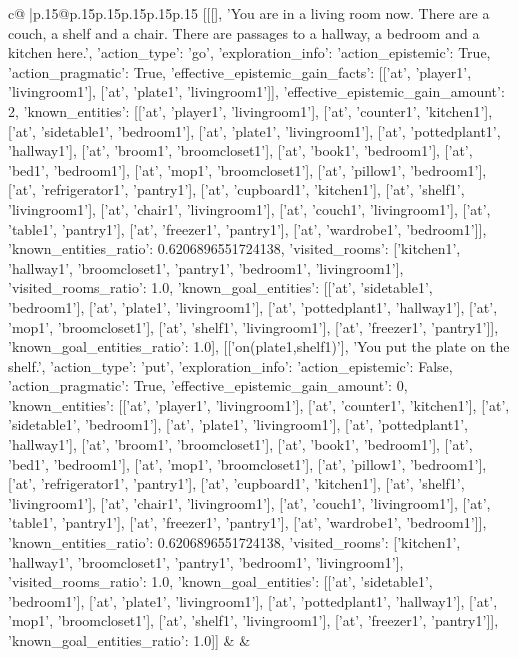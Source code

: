 \documentclass{article}
\begin{document}
{\begin{supertabular}{c@{$\;$}|p{.15\linewidth}@{}p{.15\linewidth}p{.15\linewidth}p{.15\linewidth}p{.15\linewidth}p{.15\linewidth}}
{{{	 [[[], 'You are in a living room now. There are a couch, a shelf and a chair. There are passages to a hallway, a bedroom and a kitchen here.', {'action_type': 'go', 'exploration_info': {'action_epistemic': True, 'action_pragmatic': True, 'effective_epistemic_gain_facts': [['at', 'player1', 'livingroom1'], ['at', 'plate1', 'livingroom1']], 'effective_epistemic_gain_amount': 2, 'known_entities': [['at', 'player1', 'livingroom1'], ['at', 'counter1', 'kitchen1'], ['at', 'sidetable1', 'bedroom1'], ['at', 'plate1', 'livingroom1'], ['at', 'pottedplant1', 'hallway1'], ['at', 'broom1', 'broomcloset1'], ['at', 'book1', 'bedroom1'], ['at', 'bed1', 'bedroom1'], ['at', 'mop1', 'broomcloset1'], ['at', 'pillow1', 'bedroom1'], ['at', 'refrigerator1', 'pantry1'], ['at', 'cupboard1', 'kitchen1'], ['at', 'shelf1', 'livingroom1'], ['at', 'chair1', 'livingroom1'], ['at', 'couch1', 'livingroom1'], ['at', 'table1', 'pantry1'], ['at', 'freezer1', 'pantry1'], ['at', 'wardrobe1', 'bedroom1']], 'known_entities_ratio': 0.6206896551724138, 'visited_rooms': ['kitchen1', 'hallway1', 'broomcloset1', 'pantry1', 'bedroom1', 'livingroom1'], 'visited_rooms_ratio': 1.0, 'known_goal_entities': [['at', 'sidetable1', 'bedroom1'], ['at', 'plate1', 'livingroom1'], ['at', 'pottedplant1', 'hallway1'], ['at', 'mop1', 'broomcloset1'], ['at', 'shelf1', 'livingroom1'], ['at', 'freezer1', 'pantry1']], 'known_goal_entities_ratio': 1.0}}], [['on(plate1,shelf1)'], 'You put the plate on the shelf.', {'action_type': 'put', 'exploration_info': {'action_epistemic': False, 'action_pragmatic': True, 'effective_epistemic_gain_amount': 0, 'known_entities': [['at', 'player1', 'livingroom1'], ['at', 'counter1', 'kitchen1'], ['at', 'sidetable1', 'bedroom1'], ['at', 'plate1', 'livingroom1'], ['at', 'pottedplant1', 'hallway1'], ['at', 'broom1', 'broomcloset1'], ['at', 'book1', 'bedroom1'], ['at', 'bed1', 'bedroom1'], ['at', 'mop1', 'broomcloset1'], ['at', 'pillow1', 'bedroom1'], ['at', 'refrigerator1', 'pantry1'], ['at', 'cupboard1', 'kitchen1'], ['at', 'shelf1', 'livingroom1'], ['at', 'chair1', 'livingroom1'], ['at', 'couch1', 'livingroom1'], ['at', 'table1', 'pantry1'], ['at', 'freezer1', 'pantry1'], ['at', 'wardrobe1', 'bedroom1']], 'known_entities_ratio': 0.6206896551724138, 'visited_rooms': ['kitchen1', 'hallway1', 'broomcloset1', 'pantry1', 'bedroom1', 'livingroom1'], 'visited_rooms_ratio': 1.0, 'known_goal_entities': [['at', 'sidetable1', 'bedroom1'], ['at', 'plate1', 'livingroom1'], ['at', 'pottedplant1', 'hallway1'], ['at', 'mop1', 'broomcloset1'], ['at', 'shelf1', 'livingroom1'], ['at', 'freezer1', 'pantry1']], 'known_goal_entities_ratio': 1.0}}]] 
	  } 
	   } 
	   } 
	 & & \\ 
 


\end{supertabular}}
\end{document}
